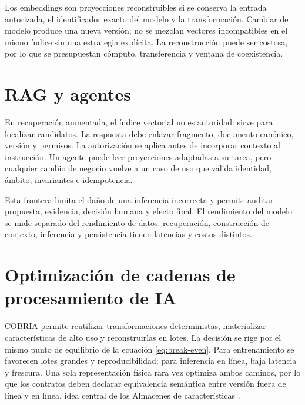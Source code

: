 Los embeddings son proyecciones reconstruibles si se conserva la entrada autorizada,
el identificador exacto del modelo y la transformación. Cambiar de modelo produce una
nueva versión; no se mezclan vectores incompatibles en el mismo índice sin una estrategia
explícita. La reconstrucción puede ser costosa, por lo que se presupuestan cómputo,
transferencia y ventana de coexistencia.

\section{RAG y agentes}

En recuperación aumentada, el índice vectorial no es autoridad: sirve para localizar
candidatos. La respuesta debe enlazar fragmento, documento canónico, versión y permisos.
La autorización se aplica antes de incorporar contexto al instrucción. Un agente puede leer
proyecciones adaptadas a su tarea, pero cualquier cambio de negocio vuelve a un caso de
uso que valida identidad, ámbito, invariantes e idempotencia.

Esta frontera limita el daño de una inferencia incorrecta y permite auditar propuesta,
evidencia, decisión humana y efecto final. El rendimiento del modelo se mide separado
del rendimiento de datos: recuperación, construcción de contexto, inferencia y
persistencia tienen latencias y costos distintos.

\section{Optimización de cadenas de procesamiento de IA}

COBRIA permite reutilizar transformaciones deterministas, materializar características
de alto uso y reconstruirlas en lotes. La decisión se rige por el mismo punto de
equilibrio de la ecuación \ref{eq:break-even}. Para entrenamiento se favorecen lotes
grandes y reproducibilidad; para inferencia en línea, baja latencia y frescura. Una sola
representación física rara vez optimiza ambos caminos, por lo que los contratos deben
declarar equivalencia semántica entre versión fuera de línea y en línea, idea central de los
Almacenes de características \parencite{orr2021featurestores,li2023featurestore}.

